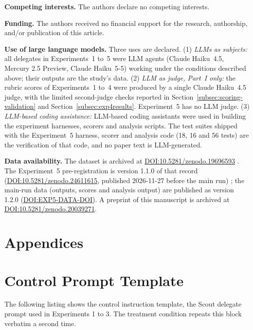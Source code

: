 \documentclass[11pt,a4paper]{article}
\begin{document}
\noindent\textbf{Competing interests.} The authors declare no competing interests.

\noindent\textbf{Funding.} The authors received no financial support for the research, authorship, and/or publication of this article.

\noindent\textbf{Use of large language models.} Three uses are declared. (1) \emph{LLMs as subjects:} all delegates in Experiments~1 to~5 were LLM agents (Claude Haiku~4.5, Mercury 2.5 Preview, Claude Haiku~5-5) working under the conditions described above; their outputs are the study's data. (2) \emph{LLM as judge, Part~I only:} the rubric scores of Experiments~1 to~4 were produced by a single Claude Haiku~4.5 judge, with the limited second-judge checks reported in Section~\ref{subsec:scoring-validation} and Section~\ref{subsec:exp4results}. Experiment~5 has no LLM judge. (3) \emph{LLM-based coding assistance:} LLM-based coding assistants were used in building the experiment harnesses, scorers and analysis scripts. The test suites shipped with the Experiment~5 harness, scorer and analysis code (18, 16 and 56 tests) are the verification of that code, and no paper text is LLM-generated.

\noindent\textbf{Data availability.} The dataset is archived at
\href{https://doi.org/10.5281/zenodo.19696593}{DOI:\allowbreak{}10.5281/zenodo.19696593}
\citep{clouatre2026dataset}. The Experiment~5 pre-registration is version 1.1.0 of that record (\href{https://doi.org/10.5281/zenodo.24611615}{DOI:\allowbreak{}10.5281/zenodo.24611615}, published 2026-11-27 before the main run) \citep{clouatre2026prereg}; the main-run data (outputs, scores and analysis output) are published as version 1.2.0 (\href{https://doi.org/EXP5-DATA-DOI}{DOI:\allowbreak{}EXP5-DATA-DOI}). A preprint of this manuscript is archived at
\href{https://doi.org/10.5281/zenodo.20039271}{DOI:\allowbreak{}10.5281/zenodo.20039271}.




\clearpage
\appendix
\section*{Appendices}

\section{Control Prompt Template}
\label{app:control-prompt}

The following listing shows the control instruction template, the Scout delegate prompt used in Experiments 1 to 3.
The treatment condition repeats this block verbatim a second time.
\end{document}
